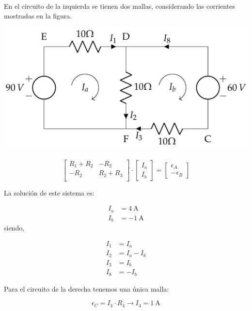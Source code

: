 En el circuito de la izquierda se tienen dos mallas, considerando las
corrientes mostradas en la figura.

\begin{center}
  \includegraphics{figuras/BT1_10_izq_mallas.pdf}
\end{center}


\begin{equation*}
  \begin{bmatrix}
    R_1 + R_2 & -R_2\\
    -R_2 & R_2 + R_3\\
  \end{bmatrix} \cdot %
  \begin{bmatrix}
    I_a\\
    I_b
  \end{bmatrix} = %
  \begin{bmatrix}
    \epsilon_A\\
    -\epsilon_B
  \end{bmatrix}
\end{equation*}

La solución de este sistema es:

\begin{align*}
  I_a &= \qty{4}{\ampere}\\
  I_b &= \qty{-1}{\ampere}
\end{align*}
siendo,

\begin{align*}
  I_1 &= I_a\\
  I_2 &= I_a - I_b\\
  I_3 &= I_b\\
  I_8 &= -I_b
\end{align*}

Para el circuito de la derecha tenemos una única malla:

\begin{equation*}
  \epsilon_C = I_4 \cdot R_4 \rightarrow I_4 = \qty{1}{\ampere}
\end{equation*}

